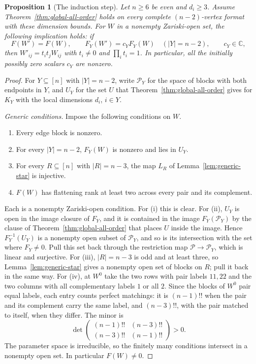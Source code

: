 \documentclass[11pt]{article}
\newtheorem{proposition}[theorem]{Proposition}
\theoremstyle{remark}\newtheorem{remark}[theorem]{Remark}
\newcommand{\C}{\mathbb C}
\newcommand{\cP}{\mathcal P}
\begin{document}
\begin{proposition}[The induction step]\label{prop:cofactor-gluing}
Let $n\geq6$ be even and $d_i\geq3$. Assume Theorem~\ref{thm:global-all-order}
holds on every complete $(n-2)$-vertex format with these
dimension bounds. For $W$ in a nonempty Zariski-open set, the
following implication holds: if
\[
 F(W')=F(W),\qquad
 F_Y(W')=c_YF_Y(W)\quad
 (|Y|=n-2),\qquad c_Y\in\C,
\]
then $W'_{ij}=t_it_jW_{ij}$ with $t_i\ne0$ and $\prod_i t_i=1$.
In particular, all the initially possibly zero scalars $c_Y$ are
nonzero.
\end{proposition}
\begin{proof}
For $Y\subseteq[n]$ with
$|Y|=n-2$, write $\cP_Y$ for the space of blocks with both endpoints in
$Y$, and $U_Y$ for the set $U$ that
Theorem~\ref{thm:global-all-order} gives for $K_Y$ with the local
dimensions $d_i$, $i\in Y$.

\emph{Generic conditions.} Impose the following conditions on $W$.
\begin{enumerate}
\item[(i)] Every edge block is nonzero.
\item[(ii)] For every $|Y|=n-2$, $F_Y(W)$ is nonzero and lies in
$U_Y$.
\item[(iii)] For every $R\subseteq[n]$ with $|R|=n-3$, the map $L_R$
of Lemma~\ref{lem:generic-star} is injective.
\item[(iv)] $F(W)$ has flattening rank at least two across every pair
and its complement.
\end{enumerate}
Each is a nonempty Zariski-open condition. For (i) this is clear. For
(ii), $U_Y$ is open in the image closure of $F_Y$, and it is
contained in the image $F_Y(\cP_Y)$ by the clause of
Theorem~\ref{thm:global-all-order} that places $U$ inside the image.
Hence $F_Y^{-1}(U_Y)$ is a nonempty open subset of $\cP_Y$, and so is
its intersection with the set where $F_Y\ne0$. Pull this set back
through the restriction map $\cP\to\cP_Y$, which is linear and
surjective. For (iii), $|R|=n-3$ is odd and at least three, so
Lemma~\ref{lem:generic-star} gives a nonempty open set of blocks on
$R$; pull it back in the same way. For (iv), at $W^0$ take the two
rows with pair labels $11,22$ and the two columns with all
complementary labels $1$ or all $2$. Since the blocks of $W^0$ pair
equal labels, each entry counts perfect matchings: it is $(n-1)!!$
when the pair and its complement carry the same label, and $(n-3)!!$,
with the pair matched to itself, when they differ. The minor is
\[
 \det\begin{pmatrix}(n-1)!!&(n-3)!!\\
                     (n-3)!!&(n-1)!!\end{pmatrix}>0.
\]
The parameter space is irreducible, so the finitely many conditions
intersect in a nonempty open set. In particular $F(W)\ne0$.


\end{proof}
\end{document}
